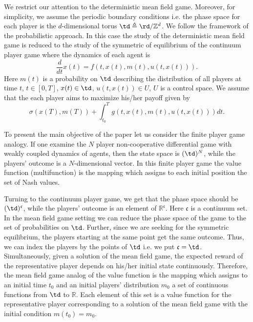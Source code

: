 \documentclass[a4paper,12pt]{article}
\begin{document}
We restrict our attention to the deterministic mean field game. Moreover, for simplicity, we assume the periodic boundary conditions i.e. the phase space for each player is the $d$-dimensional torus $\td\triangleq \rd/\mathbb{Z}^d$. We follow the framework of the  probabilistic approach. In this case  the study of the deterministic mean field game is reduced to the study of the symmetric of equilibrium of the continuum player game where the dynamics of each agent is \begin{equation}\label{sys:dynamics}
\frac{d}{dt}x(t)=f(t,x(t),m(t),u(t,x(t))).
\end{equation} Here $m(t)$ is a probability on $\td$ describing the distribution of all players at time $t$, $t\in [0,T]$, $x(t)\in\td$, $u(t,x(t))\in U$,  $U$ is a control space.   We assume that the each player  aims to maximize his/her payoff given by
\begin{equation}\label{sys:payoff}
\sigma(x(T),m(T))+\int_{t_0}^Tg(t,x(t),m(t),u(t,x(t)))dt.
\end{equation}

To present the main objective of the paper let us consider the finite player game analogy. If one examine the $N$ player non-cooperative differential game with weakly coupled dynamics of  agents, then the state  space is $(\td)^N$, while the players' outcome is a $N$-dimensional vector. In this finite player game the value function (multifunction)  is the mapping which assigns to each initial position the set of Nash values. 

Turning  to the continuum player game, we get that the phase space should be $(\td)^{\mathfrak{c}}$, while the players' outcome is an element of $\mathbb{R}^\mathfrak{c}$. Here $\mathfrak{c}$ is a continuum set. In the mean field game setting we can reduce the phase space of the game to the set of  probabilities on $\td$. Further, since we are seeking for the symmetric equilibrium, the players starting at the same point get the same outcome. Thus, we can index the players by the points of $\td$ i.e. we put $\mathfrak{c}=\td$. Simultaneously, given a solution of the mean field game, the  expected reward of the representative player depends on his/her initial state continuously. Therefore, the mean field game analog of the value function is the mapping which assigns to an initial time $t_0$ and an initial players' distribution $m_0$ a set of  continuous functions from $\td$ to $\mathbb{R}$. Each element of this set is a value function   for the representative player corresponding to a solution of the mean field game with the initial condition $m(t_0)=m_0$.  
\end{document}
